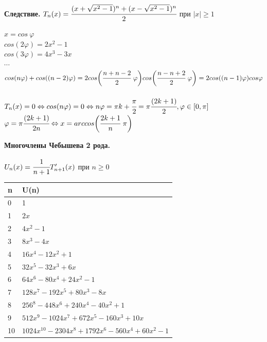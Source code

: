 \documentclass[12pt]{article}
\theoremstyle{definition}
\numberwithin{equation}{section}
\begin{document}
\textbf{Следствие.}
$T_n(x)=\cfrac{(x+\sqrt{x^2-1})^n+(x-\sqrt{x^2-1})^n}{2}$ при $ |x| \geqslant 1$
\begin{center}
$x=cos~\varphi$\\
$cos(2\varphi)=2x^2-1$\\
$cos(3\varphi)=4x^3-3x$\\
$\cdots$\\
$cos(n\varphi)+cos((n-2)\varphi)=2cos \bigg(\cfrac{n+n-2}{2}~\varphi \bigg)cos \bigg(\cfrac{n-n+2}{2}~\varphi \bigg)=2cos((n-1)\varphi)cos \varphi$\\
~\\
$T_n(x)=0 \Leftrightarrow cos(n\varphi)=0 \Leftrightarrow n\varphi=\pi k +\cfrac{\pi}{2}=\pi\cfrac{(2k+1)}{2}, \varphi \in [0, \pi]$\\
$\varphi=\pi\cfrac{(2k+1)}{2n} \Leftrightarrow x=arccos \bigg(\cfrac{2k+1}{n}~\pi \bigg)$\end{center}
\textbf{Многочлены Чебышева 2 рода.}
\begin{center} $U_n(x)=\cfrac{1}{n+1}T_{n+1}'(x)$ при $ n \geqslant 0$\end{center}
\begin{center}
\begin{tabular}{|l|l|}
\hline
\textbf{n} & \textbf{U(n)} \\ \hline
0 & 1 \\ \hline
1 & $2x$ \\ \hline
2 & $4x^2-1$ \\ \hline
3 & $8x^3-4x$ \\ \hline
4 & $16x^4-12x^2+1$ \\ \hline
5 & $32x^5-32x^3+6x$ \\ \hline
6 & $64x^6-80x^4+24x^2-1$ \\ \hline
7 & $128x^7-192x^5+80x^3-8x$ \\ \hline
8 & $256^8-448x^6+240x^4-40x^2+1$ \\ \hline
9 & $512x^9-1024x^7+672x^5-160x^3+10x$ \\ \hline
10 & $1024x^{10}-2304x^8+1792x^6-560x^4+60x^2-1$ \\ \hline
\end{tabular}
\end{center} 
\end{document}
